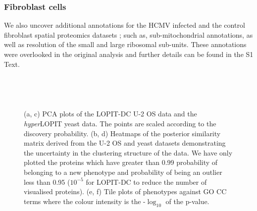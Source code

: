 \documentclass[12pt,english]{article}
\begin{document}
\subsubsection*{Fibroblast cells}
We also uncover additional annotations for the HCMV infected and the control fibroblast spatial proteomics datasets \citep{Jean_Beltran:2016}; such as, sub-mitochondrial annotations, as well as resolution of the small and large ribosomal sub-units. These annotations were overlooked in the original analysis \citep{Jean_Beltran:2016} and further details can be found in the S1 Text.
 
\begin{figure}
	\begin{subfigure}[t]{0.5\textwidth}
	\centering
	\caption{}
\end{subfigure}
\begin{subfigure}[t]{0.5\textwidth}
	\centering
	\caption{}
\end{subfigure}
~
\begin{subfigure}[t]{0.5\textwidth}
	\centering
	\caption{}
\end{subfigure}
\begin{subfigure}[t]{0.5\textwidth}
	\centering
	\caption{}
\end{subfigure}
~
\begin{subfigure}[t]{0.5\textwidth}
	\centering
	\caption{}
\end{subfigure}
\begin{subfigure}[t]{0.5\textwidth}
	\centering
	\caption{}
\end{subfigure}
\caption{(a, c) PCA plots of the LOPIT-DC U-2 OS data and the \textit{hyper}LOPIT yeast data. The points are scaled according to the discovery probability. (b, d) Heatmaps of the posterior similarity matrix derived from the U-2 OS and yeast datasets demonstrating the uncertainty in the clustering structure of the data. We have only plotted the proteins which have greater than 0.99 probability of belonging to a new phenotype and probability of being an outlier less than 0.95 ($10^{-5}$ for LOPIT-DC to reduce the number of visualised proteins). (e, f) Tile plots of phenotypes against GO CC terms where the colour intensity is the -$\log_{10}$ of the p-value.}
 \label{figure:DC}
\end{figure}
\end{document}
